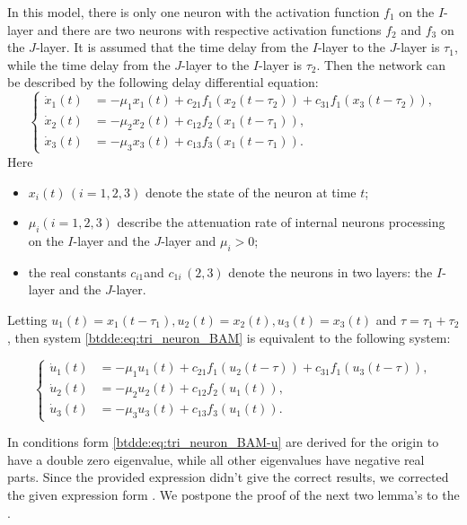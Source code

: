 In this model, there is only one neuron with the activation function
$f_{1}$ on the $I$-layer and there are two neurons with respective
activation functions $f_{2}$ and $f_{3}$ on the $J$-layer. It is assumed 
that the time delay from the $I$-layer to the $J$-layer is $\tau_{1}$,
while the time delay from the $J$-layer to the $I$-layer is $\tau_{2}$.
Then the network can be described by the following delay differential equation:
\begin{equation}
\label{btdde:eq:tri_neuron_BAM}
\begin{cases}
\dot{x}_{1}(t) & =-\mu_{1}x_{1}(t)+c_{21}f_{1}(x_{2}(t-\tau_{2}))+c_{31}f_{1}(x_{3}(t-\tau_{2})),\\
\dot{x}_{2}(t) & =-\mu_{2}x_{2}(t)+c_{12}f_{2}(x_{1}(t-\tau_{1})),\\
\dot{x}_{3}(t) & =-\mu_{3}x_{3}(t)+c_{13}f_{3}(x_{1}(t-\tau_{1})).
\end{cases}
\end{equation}
Here
\begin{itemize}
\item $x_{i}(t)\,(i=1,2,3)$ denote the state of the neuron at time $t$;
\item $\mu_{i}(i=1,2,3)$ describe the attenuation rate of internal neurons
processing on the $I$-layer and the $J$-layer and $\mu_{i}>0$;
\item the real constants $c_{i1}$and $c_{1i}\,(2,3)$ denote the neurons
in two layers: the $I$-layer and the $J$-layer.
\end{itemize}
Letting $u_{1}(t)=x_{1}(t-\tau_{1}),u_{2}(t)=x_{2}(t),u_{3}(t)=x_{3}(t)$
and $\tau=\tau_{1}+\tau_{2}$, then system \cref{btdde:eq:tri_neuron_BAM}
is equivalent to the following system:

\begin{equation}
\label{btdde:eq:tri_neuron_BAM-u}
\begin{cases}
\dot{u}_{1}(t) & =-\mu_{1}u_{1}(t)+c_{21}f_{1}(u_{2}(t-\tau))+c_{31}f_{1}(u_{3}(t-\tau)),\\
\dot{u}_{2}(t) & =-\mu_{2}u_{2}(t)+c_{12}f_{2}(u_{1}(t)),\\
\dot{u}_{3}(t) & =-\mu_{3}u_{3}(t)+c_{13}f_{3}(u_{1}(t)).
\end{cases}
\end{equation}

In \cite{dong2013bogdanov} conditions form \cref{btdde:eq:tri_neuron_BAM-u} are derived
for the origin to have a double zero eigenvalue, while all other eigenvalues
have negative real parts. Since the provided expression didn't give the correct results,
we corrected the given expression form \cite{dong2013bogdanov}.
We postpone the proof of the next two lemma's to the
\fi. 

